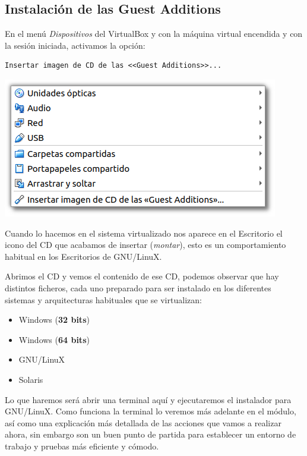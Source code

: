 \documentclass[11pt]{article}
\begin{document}
\subsection{Instalación de las Guest Additions}
\label{sec:org2dc84e5}
En el menú \emph{Dispositivos} del VirtualBox y con la máquina virtual
encendida y con la sesión iniciada, activamos la opción:

\begin{verbatim}
Insertar imagen de CD de las <<Guest Additions>>...
\end{verbatim}

\begin{center}
\includegraphics[width=.9\linewidth]{imgs/VBox_GuestAdd_LinuX_004.png}
\end{center}

Cuando lo hacemos en el sistema virtualizado nos aparece en el
Escritorio el icono del CD que acabamos de insertar (\emph{montar}), esto es
un comportamiento habitual en los Escritorios de GNU/LinuX.

Abrimos el CD y vemos el contenido de ese CD, podemos observar que hay
distintos ficheros, cada uno preparado para ser instalado en los
diferentes sistemas y arquitecturas habituales que se virtualizan:

\begin{itemize}
\item Windows (\textbf{32 bits})
\item Windows (\textbf{64 bits})
\item GNU/LinuX
\item Solaris
\end{itemize}

Lo que haremos será abrir una terminal aquí y ejecutaremos el instalador
para GNU/LinuX. Como funciona la terminal lo veremos más adelante en el
módulo, así como una explicación más detallada de las acciones que vamos
a realizar ahora, sin embargo son un buen punto de partida para
establecer un entorno de trabajo y pruebas más eficiente y cómodo.
\end{document}
